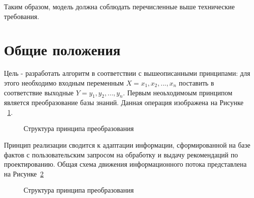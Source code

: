 Таким образом, модель должна соблюдать перечисленные выше технические требования.

\section{Общие положения}\label{sec:ch3/sect1}

Цель - разработать алгоритм в соответствии с вышеописанными принципами:
для этого необходимо входным переменным $X = {x_1, x_2, ..., x_n}$ поставить в соответствие выходные $Y = {y_1, y_2, ..., y_n}$. Первым неоьходимоым принципом является преобразование базы знаний. Данная операция изображена на Рисунке ~\cref{fig:NNprin}.
\begin{figure}[ht]
    \caption{Структура принципа преобразования}\label{fig:NNprin}
\end{figure}

Принцип реализации сводится к адаптации информации, сформированной на базе фактов с пользовательским запросом на обработку и выдачу рекомендаций по проектированию. Общая схема движения информационного потока представлена на Рисунке~\cref{fig:Dataflow} 

\begin{figure}[ht]
    \caption{Структура принципа преобразования}\label{fig:Dataflow}
\end{figure}






